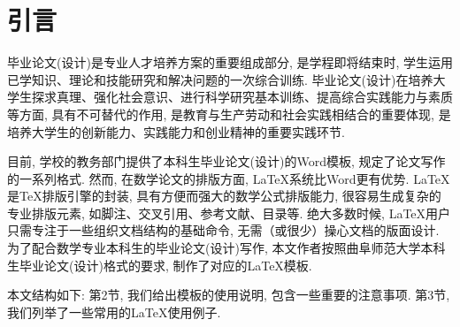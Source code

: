\section{引言}

毕业论文(设计)是专业人才培养方案的重要组成部分, 是学程即将结束时, 学生运用已学知识、理论和技能研究和解决问题的一次综合训练. 毕业论文(设计)在培养大学生探求真理、强化社会意识、进行科学研究基本训练、提高综合实践能力与素质等方面, 具有不可替代的作用, 是教育与生产劳动和社会实践相结合的重要体现, 是培养大学生的创新能力、实践能力和创业精神的重要实践环节.

目前, 学校的教务部门提供了本科生毕业论文(设计)的Word模板, 规定了论文写作的一系列格式. 然而, 在数学论文的排版方面, \LaTeX 系统比Word更有优势. \LaTeX 是\TeX 排版引擎的封装, 具有方便而强大的数学公式排版能力, 很容易生成复杂的专业排版元素, 如脚注、交叉引用、参考文献、目录等. 绝大多数时候, \LaTeX 用户只需专注于一些组织文档结构的基础命令, 无需（或很少）操心文档的版面设计. 为了配合数学专业本科生的毕业论文(设计)写作, 本文作者按照曲阜师范大学本科生毕业论文(设计)格式的要求, 制作了对应的\LaTeX 模板.

本文结构如下: 第2节, 我们给出模板的使用说明, 包含一些重要的注意事项. 第3节, 我们列举了一些常用的\LaTeX 使用例子.

